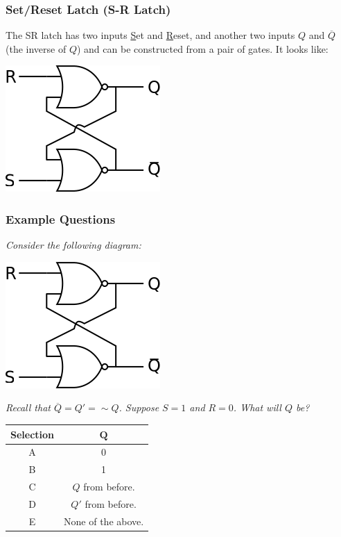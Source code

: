 \documentclass[letterpaper]{article}
\begin{document}
\subsubsection{Set/Reset Latch (S-R Latch)}
The SR latch has two inputs \underline{S}et and \underline{R}eset, and another two inputs $Q$ and $\overline{Q}$ (the inverse of $Q$) and can be constructed from a pair of  gates. It looks like:
\begin{center}
    \includegraphics[scale=0.5]{SR_latch.png}
\end{center}

\subsubsection{Example Questions}
\emph{Consider the following diagram:}
\begin{center}
    \includegraphics[scale=0.5]{SR_latch.png}
\end{center}
\emph{Recall that $\overline{Q} = Q' = \sim Q$. Suppose $S = 1$ and $R = 0$. What will $Q$ be?}
\begin{center}
    \begin{tabular}{c|c}
        \textbf{Selection} & $\mathbf{Q}$ \\ 
        \hline 
        A & 0 \\ 
        B & 1 \\ 
        C & $Q$ from before. \\ 
        D & $Q'$ from before. \\ 
        E & None of the above.
    \end{tabular}
\end{center}
\end{document}

